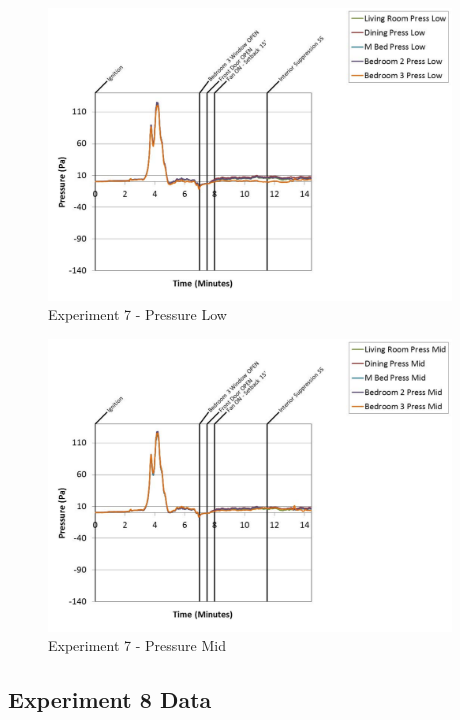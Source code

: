 \documentclass{article}
\begin{document}
\begin{appendices}
	\begin{figure}[h!]
		\centering
		\includegraphics[height=3.05in]{0_Images/Results_Charts/Exp_7_Charts/PressureLow.pdf}
		\caption{Experiment 7 - Pressure Low}
	\end{figure}
 
	\clearpage

	\begin{figure}[h!]
		\centering
		\includegraphics[height=3.05in]{0_Images/Results_Charts/Exp_7_Charts/PressureMid.pdf}
		\caption{Experiment 7 - Pressure Mid}
	\end{figure}
 

		\clearpage
\clearpage		\large
\subsection{Experiment 8 Data} \label{App:Exp8Results} 


\end{appendices}
\end{document}
